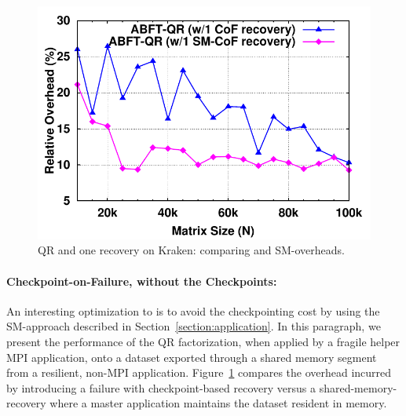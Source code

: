 \begin{figure}[thb]
\centering
	\includegraphics[scale=.6]{figures/kraken_shmem_576cores_squeeze.pdf}
	\caption{\abft QR and one recovery on Kraken: comparing
          \cof and SM-\cof overheads.}%
	\label{fig:smcof}	
\end{figure}

\paragraph*{Checkpoint-on-Failure, without the Checkpoints:} An
interesting optimization to \cof is to avoid the checkpointing cost
by using the SM-\cof approach described in
Section~\ref{section:application}. In this paragraph, we present the
performance of the QR factorization, when applied by a fragile helper
MPI application, onto a dataset exported through a shared memory
segment from a resilient, non-MPI application. Figure~\ref{fig:smcof}
compares the overhead incurred by introducing a failure with
checkpoint-based \cof recovery versus a shared-memory-\cof recovery
where a master application maintains the dataset resident in memory.


